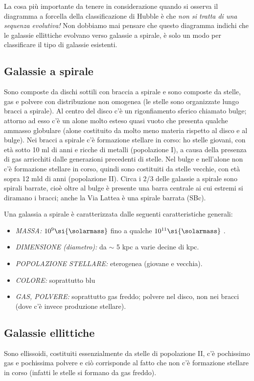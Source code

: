 La cosa più importante da tenere in considerazione quando si osserva il diagramma a forcella della classificazione di Hubble è che \emph{non si tratta di una sequenza evolutiva!} Non dobbiamo mai pensare che questo diagramma indichi che le galassie ellittiche evolvano verso galassie a spirale, è solo un modo per classificare il tipo di galassie esistenti.

\subsection{Galassie a spirale} Sono composte da dischi sottili con braccia a spirale e sono composte da stelle, gas e polvere con distribuzione non omogenea (le stelle sono organizzate lungo bracci a spirale). Al centro del disco c’è un rigonfiamento sferico chiamato bulge; attorno ad esso c’è un alone molto esteso quasi vuoto che presenta qualche ammasso globulare (alone costituito da molto meno materia rispetto al disco e al bulge). Nei bracci a spirale c’è formazione stellare in corso: ho stelle giovani, con età sotto 10 ml di anni e ricche di metalli (popolazione I), a causa della presenza di gas arricchiti dalle generazioni precedenti di stelle. Nel bulge e nell’alone non c’è formazione stellare in corso, quindi sono costituiti da stelle vecchie, con età sopra 12 mld di anni (popolazione II). Circa i 2/3 delle galassie a spirale sono spirali barrate, cioè oltre al bulge è presente una barra centrale ai cui estremi si diramano i bracci; anche la Via Lattea è una spirale barrata (SBc).

Una galassia a spirale è caratterizzata dalle seguenti caratteristiche generali:
\begin{itemize}
	\item \emph{MASSA:} $10^9 \si{\solarmass}$ fino a qualche $10^{11} \si{\solarmass}$ .
	\item \emph{DIMENSIONE (diametro):} da $\sim$ 5 kpc a varie decine di kpc.
	\item \emph{POPOLAZIONE STELLARE:} eterogenea (giovane e vecchia).
	\item \emph{COLORE:} soprattutto blu
	\item \emph{GAS, POLVERE:} soprattutto gas freddo; polvere nel disco, non nei bracci (dove c'è invece produzione stellare).
\end{itemize}

\subsection{Galassie ellittiche} Sono ellissoidi, costituiti essenzialmente da stelle di popolazione II, c’è pochissimo gas e pochissima polvere e ciò corrisponde al fatto che non c’è formazione stellare in corso (infatti le stelle si formano da gas freddo).

